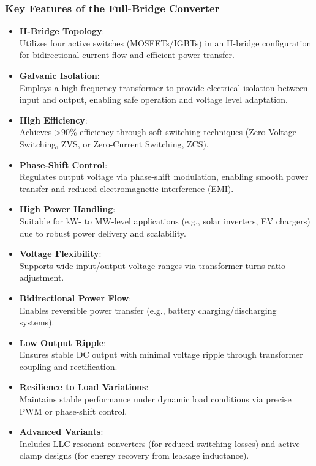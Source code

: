 \subsubsection*{Key Features of the Full-Bridge Converter}
\begin{itemize}
    \item \textbf{H-Bridge Topology}: \\
    Utilizes four active switches (MOSFETs/IGBTs) in an H-bridge configuration for bidirectional current flow and efficient power transfer.
    
    \item \textbf{Galvanic Isolation}: \\
    Employs a high-frequency transformer to provide electrical isolation between input and output, enabling safe operation and voltage level adaptation.
    
    \item \textbf{High Efficiency}: \\
    Achieves \textgreater90\% efficiency through soft-switching techniques (Zero-Voltage Switching, ZVS, or Zero-Current Switching, ZCS).
    
    \item \textbf{Phase-Shift Control}: \\
    Regulates output voltage via phase-shift modulation, enabling smooth power transfer and reduced electromagnetic interference (EMI).
    
    \item \textbf{High Power Handling}: \\
    Suitable for kW- to MW-level applications (e.g., solar inverters, EV chargers) due to robust power delivery and scalability.
    
    \item \textbf{Voltage Flexibility}: \\
    Supports wide input/output voltage ranges via transformer turns ratio adjustment.

    \item \textbf{Bidirectional Power Flow}: \\
    Enables reversible power transfer (e.g., battery charging/discharging systems).

    \item \textbf{Low Output Ripple}: \\
    Ensures stable DC output with minimal voltage ripple through transformer coupling and rectification.

    \item \textbf{Resilience to Load Variations}: \\
    Maintains stable performance under dynamic load conditions via precise PWM or phase-shift control.

    \item \textbf{Advanced Variants}: \\
    Includes LLC resonant converters (for reduced switching losses) and active-clamp designs (for energy recovery from leakage inductance).



\end{itemize}
